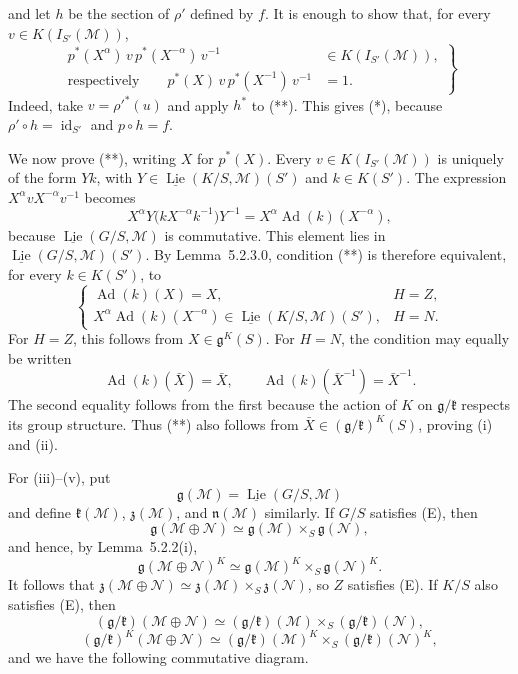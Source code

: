 and let \(h\) be the section of \(\rho'\) defined by \(f\). It is
enough to show that, for every \(v\in K(I_{S'}(\mathscr M))\),
\begin{equation}
 \left.
 \begin{aligned}
 p^*(X^\alpha)\,v\,p^*(X^{-\alpha})\,v^{-1}
     &\in K(I_{S'}(\mathscr M)),\\
 \text{respectively}\qquad
 p^*(X)\,v\,p^*(X^{-1})\,v^{-1}&=1.
 \end{aligned}
 \right\}
\tag{**}
\end{equation}
Indeed, take \(v=\rho'^*(u)\) and apply \(h^*\) to (**). This gives
(*), because \(\rho'\circ h=\operatorname{id}_{S'}\) and
\(p\circ h=f\).

We now prove (**), writing \(X\) for \(p^*(X)\). Every
\(v\in K(I_{S'}(\mathscr M))\) is uniquely of the form \(Yk\), with
\(Y\in\underline{\operatorname{Lie}}(K/S,\mathscr M)(S')\) and
\(k\in K(S')\). The expression
\(X^\alpha vX^{-\alpha}v^{-1}\) becomes
\[
 X^\alpha Y\bigl(kX^{-\alpha}k^{-1}\bigr)Y^{-1}
 =X^\alpha\operatorname{Ad}(k)(X^{-\alpha}),
\]
because \(\underline{\operatorname{Lie}}(G/S,\mathscr M)\) is
commutative. This element lies in
\(\underline{\operatorname{Lie}}(G/S,\mathscr M)(S')\). By
Lemma~5.2.3.0, condition (**) is therefore equivalent, for every
\(k\in K(S')\), to
\[
 \begin{cases}
 \operatorname{Ad}(k)(X)=X, & H=Z,\\
 X^\alpha\operatorname{Ad}(k)(X^{-\alpha})
   \in\underline{\operatorname{Lie}}(K/S,\mathscr M)(S'), & H=N.
 \end{cases}
\]
For \(H=Z\), this follows from \(X\in\mathfrak g^K(S)\). For \(H=N\),
the condition may equally be written
\begin{equation}
 \operatorname{Ad}(k)(\bar X)=\bar X,
 \qquad
 \operatorname{Ad}(k)(\bar X^{-1})=\bar X^{-1}.
\tag{*'}
\end{equation}
The second equality follows from the first because the action of \(K\)
on \(\mathfrak g/\mathfrak k\) respects its group structure. Thus (**)
also follows from
\(\bar X\in(\mathfrak g/\mathfrak k)^K(S)\), proving (i) and (ii).

For (iii)--(v), put
\[
 \mathfrak g(\mathscr M)
   =\underline{\operatorname{Lie}}(G/S,\mathscr M)
\]
and define \(\mathfrak k(\mathscr M)\), \(\mathfrak z(\mathscr M)\),
and \(\mathfrak n(\mathscr M)\) similarly. If \(G/S\) satisfies (E),
then
\[
 \mathfrak g(\mathscr M\oplus\mathscr N)
 \simeq\mathfrak g(\mathscr M)\times_S\mathfrak g(\mathscr N),
\]
and hence, by Lemma~5.2.2(i),
\[
 \mathfrak g(\mathscr M\oplus\mathscr N)^K
 \simeq
 \mathfrak g(\mathscr M)^K\times_S\mathfrak g(\mathscr N)^K.
\]
It follows that
\(\mathfrak z(\mathscr M\oplus\mathscr N)
\simeq\mathfrak z(\mathscr M)\times_S\mathfrak z(\mathscr N)\), so
\(Z\) satisfies (E). If \(K/S\) also satisfies (E), then
\[
 (\mathfrak g/\mathfrak k)(\mathscr M\oplus\mathscr N)
 \simeq
 (\mathfrak g/\mathfrak k)(\mathscr M)
 \times_S(\mathfrak g/\mathfrak k)(\mathscr N),
\]
\[
 (\mathfrak g/\mathfrak k)^K(\mathscr M\oplus\mathscr N)
 \simeq
 (\mathfrak g/\mathfrak k)(\mathscr M)^K
 \times_S(\mathfrak g/\mathfrak k)(\mathscr N)^K,
\]
and we have the following commutative diagram.


